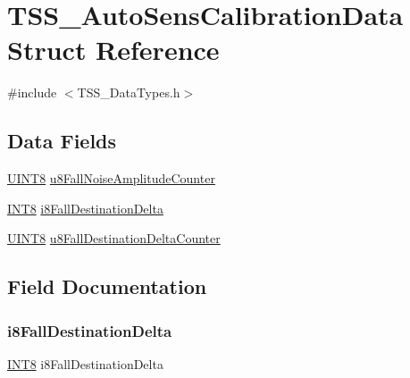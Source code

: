 \hypertarget{struct_t_s_s___auto_sens_calibration_data}{}\section{T\+S\+S\+\_\+\+Auto\+Sens\+Calibration\+Data Struct Reference}
\label{struct_t_s_s___auto_sens_calibration_data}


{\ttfamily \#include $<$T\+S\+S\+\_\+\+Data\+Types.\+h$>$}

\subsection*{Data Fields}
\begin{DoxyCompactItemize}
\item 
\hyperlink{_t_s_s___data_types_8h_ab27e9918b538ce9d8ca692479b375b6a}{U\+I\+N\+T8} \hyperlink{struct_t_s_s___auto_sens_calibration_data_ac3f15a93dea06c3c292eda5e9c63fe39}{u8\+Fall\+Noise\+Amplitude\+Counter}
\item 
\hyperlink{_t_s_s___data_types_8h_a7ebe70ceca856797319175e30bcf003d}{I\+N\+T8} \hyperlink{struct_t_s_s___auto_sens_calibration_data_a88fffb7639b8e01c16567a6c0d5880e8}{i8\+Fall\+Destination\+Delta}
\item 
\hyperlink{_t_s_s___data_types_8h_ab27e9918b538ce9d8ca692479b375b6a}{U\+I\+N\+T8} \hyperlink{struct_t_s_s___auto_sens_calibration_data_a09b371d307563a2d456fe10dc864c0bc}{u8\+Fall\+Destination\+Delta\+Counter}
\end{DoxyCompactItemize}


\subsection{Field Documentation}
\mbox{\label{struct_t_s_s___auto_sens_calibration_data_a88fffb7639b8e01c16567a6c0d5880e8}} 
\subsubsection{\texorpdfstring{i8\+Fall\+Destination\+Delta}{i8FallDestinationDelta}}
{\footnotesize\ttfamily \hyperlink{_t_s_s___data_types_8h_a7ebe70ceca856797319175e30bcf003d}{I\+N\+T8} i8\+Fall\+Destination\+Delta}

